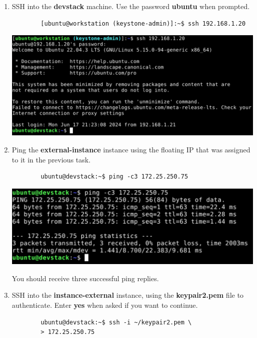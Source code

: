 \documentclass[letterpaper, 12pt]{article}
\begin{document}
\begin{enumerate}
    \item SSH into the \textbf{devstack} machine. Use the password \textbf{ubuntu} when prompted.
    \begin{lstlisting}
        [ubuntu@workstation (keystone-admin)]:~$ ssh 192.168.1.20
    \end{lstlisting}

    \begin{center}
        \includegraphics[width=\linewidth]{images/part6/step8.png}
    \end{center}

    \item Ping the \textbf{external-instance} instance using the floating IP that was assigned to it in the previous
    task.
    \begin{lstlisting}
        ubuntu@devstack:~$ ping -c3 172.25.250.75
    \end{lstlisting}

    \begin{center}
        \includegraphics[width=\linewidth]{images/part6/step9.png}
    \end{center}

    \begin{notebox}
        You should receive three successful ping replies.
    \end{notebox}

    \item SSH into the \textbf{instance-external} instance, using the \textbf{keypair2.pem} file to authenticate. Enter
    \textbf{yes} when asked if you want to continue.
    \begin{lstlisting}
        ubuntu@devstack:~$ ssh -i ~/keypair2.pem \
        > 172.25.250.75
    \end{lstlisting}
 

\end{enumerate}
\end{document}
